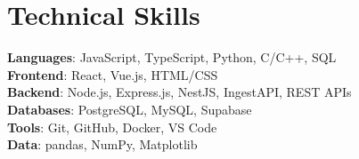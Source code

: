 \documentclass[letterpaper,11pt]{article}
\begin{document}
\section{Technical Skills}
 \begin{itemize}[leftmargin=0.15in, label={}]
    \small{\item{
     \textbf{Languages}{: JavaScript, TypeScript, Python, C/C++, SQL} \\
     \textbf{Frontend}{: React, Vue.js, HTML/CSS} \\
     \textbf{Backend}{: Node.js, Express.js, NestJS, IngestAPI, REST APIs} \\
     \textbf{Databases}{: PostgreSQL, MySQL, Supabase} \\
     \textbf{Tools}{: Git, GitHub, Docker, VS Code} \\
     \textbf{Data}{: pandas, NumPy, Matplotlib} }}
 \end{itemize}


\end{document}
